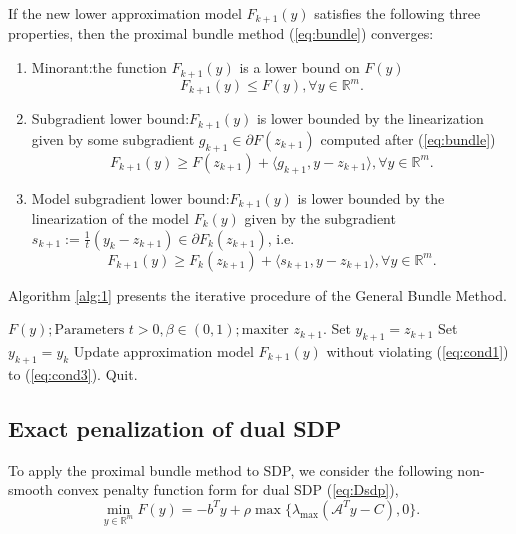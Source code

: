 \documentclass{jcmlatex}
\begin{document}
If the new lower approximation model $F_{k+1}(y)$ satisfies the following three properties\cite{liao2023overview}, then the proximal bundle method (\ref{eq:bundle}) converges:
\begin{enumerate}
    \item Minorant:\text{ }the function $F_{k+1}(y)$ is a lower bound on $F(y)$
        \begin{equation}\label{eq:cond1}
        F_{k+1}(y)\leq F(y),\forall y\in \mathbb{R}^{m}.
        \end{equation}
    \item Subgradient lower bound:\text{ }$F_{k+1}(y)$ is lower bounded by the linearization given by some subgradient $g_{k+1} \in \partial F(z_{k+1})$ computed after (\ref{eq:bundle})
        \begin{equation}\label{eq:cond2}
        F_{k+1}(y)\geq F(z_{k+1})+\langle g_{k+1},y-z_{k+1}\rangle,\forall y\in \mathbb{R}^{m}.
        \end{equation}
    \item Model subgradient lower bound:\text{ }$F_{k+1}(y)$ is lower bounded by the linearization of the model  $F_{k}(y)$ given by the subgradient $s_{k+1} := \frac{1}{t}(y_{k}-z_{k+1}) \in \partial F_{k}(z_{k+1})$, i.e.
        \begin{equation}\label{eq:cond3}
        F_{k+1}(y)\geq F_{k}(z_{k+1})+\langle s_{k+1},y-z_{k+1}\rangle,\forall y\in \mathbb{R}^{m}.
        \end{equation}
\end{enumerate}
Algorithm \ref{alg:1} presents the iterative procedure of the General Bundle Method.
\begin{algorithm}[H]
\caption{General Bundle Method}\label{alg:1}
\begin{algorithmic}[1]
    \Require $ F(y);\text{Parameters } t>0,\beta \in (0,1);\text{maxiter}$
        \State {} \(z_{k+1}\).
            \State Set \(y_{k+1}=z_{k+1}\)
        \Else
            \State Set \(y_{k+1}=y_{k}\)
        \EndIf
        \State Update approximation model \(F_{k+1}(y)\) without violating (\ref{eq:cond1}) to (\ref{eq:cond3}).
            \State Quit.
        \EndIf
    \EndFor
\end{algorithmic}
\end{algorithm}
\subsection{Exact penalization of dual SDP}
To apply the proximal bundle method to SDP, we consider the following non-smooth convex penalty function form for dual SDP (\ref{eq:Dsdp}),
\begin{equation}\label{eq:penalty}
\underset{y\in \mathbb{R}^{m}}{\min}F(y)=-b^{T}y+\rho\max\{\lambda_{\max}(\mathcal{A}^{T}y-C),0\}.
\end{equation}
\end{document}
